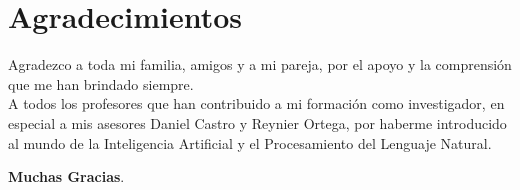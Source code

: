 
\chapter*{Agradecimientos}

\setlength{\parindent}{0px} 
Agradezco a toda mi familia, amigos y a mi pareja, por el apoyo y la comprensión que me han brindado siempre.\\

A todos los profesores que han contribuido a mi formación como investigador, en especial a mis asesores Daniel Castro y Reynier Ortega, por haberme introducido al mundo de la Inteligencia Artificial y el Procesamiento del Lenguaje Natural.

\begin{flushright}
\textbf{Muchas Gracias}.
\end{flushright} 

